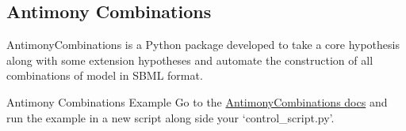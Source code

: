 \documentclass[../../main]{subfiles}
\begin{document}
    \subsection{Antimony Combinations}
    AntimonyCombinations is a Python package developed to take a core hypothesis along with some extension
    hypotheses and automate the construction of all combinations of model in SBML format.

    \begin{Task}[label=AntimonyCombinations]{Antimony Combinations Example}
        Go to the \href{https://antimonycombinations.readthedocs.io/en/latest/}{AntimonyCombinations docs} and run the
        example in a new script along side your `control\_script.py'.
    \end{Task}

\end{document}
